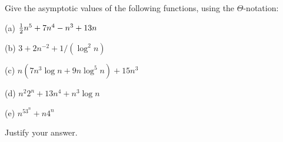 \documentclass{article}
\begin{document}
\begin{problem}
Give the asymptotic values of the
following functions, using the $\Theta$-notation:
%
\begin{description}
%
\item{(a)} $\mbox{$\frac{1}{2}$} n^5 + 7 n^4 - n^3 + 13n$
\item{(b)} $3 + 2n^{-2} + 1/(\log^2 n)$
\item{(c)} $n ( 7n^3\log n + 9 n\log^5n) + 15n^3$
\item{(d)} $n^2 2^n + 13n^4 + n^3\log n$
\item{(e)} $n^53^n + n4^n$
%
\end{description}
%
Justify your answer.


\end{problem}
\end{document}

